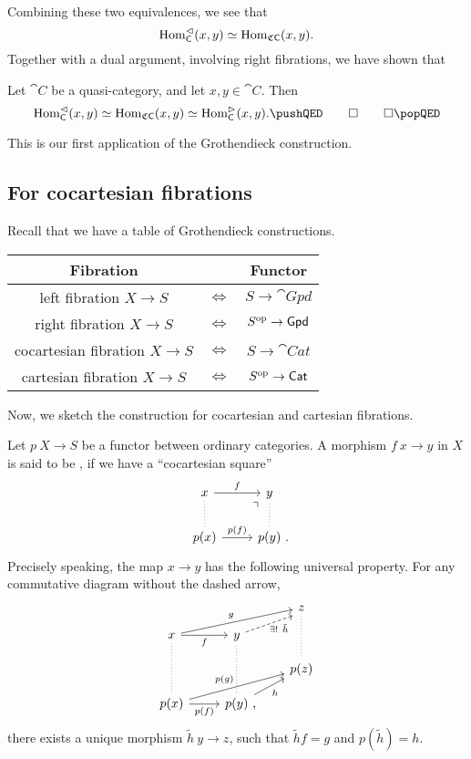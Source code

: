 Combining these two equivalences, we see that
\[\operatorname{Hom}_{\textup{\textsf{C}}}^\vartriangleleft(x,y)\simeq\operatorname{Hom}_{\mathfrak C\textup{\textsf{C}}}(x,y).\]
Together with a dual argument, involving right fibrations,
we have shown that 

\begin{theorem} \label{thm-5-h}
    Let $\cat C$ be a quasi-category, and let $x,y\in\cat C$. Then 
    \[\Hom_{\cat C}^\vartriangleleft(x,y)\simeq\Hom_{\mathfrak C\cat C}(x,y)
    \simeq\Hom_{\cat C}^\vartriangleright(x,y). \thmqedhere \]
\end{theorem}

This is our first application of the Grothendieck construction.

\subsection{For cocartesian fibrations}

Recall that we have a table of Grothendieck constructions.

\begin{center}
    \begin{tabular}{ccc}
        \textbf{Fibration} & & \textbf{Functor} \\ \hline
        left fibration $X\to S$ & $\Longleftrightarrow$ & $S\to\cat{Gpd}$ \\
        right fibration $X\to S$ & $\Longleftrightarrow$ & $S^{\mathrm{op}}\to\textup{\textsf{Gpd}}$ \\
        cocartesian fibration $X\to S$ & $\Longleftrightarrow$ & $S\to\cat{Cat}$ \\
        cartesian fibration $X\to S$ & $\Longleftrightarrow$ & $S^{\mathrm{op}}\to\textup{\textsf{Cat}}$ \\
    \end{tabular}
\end{center}

Now, we sketch the construction for cocartesian and cartesian fibrations.

Let $p\:X\to S$ be a functor between ordinary categories.
A morphism $f\:x\to y$ in $X$ is said to be ,
if we have a ``cocartesian square''
\[\begin{tikzcd}
    x\ar[d,dotted,dash]\ar[r,"f"] & y\ar[d,dotted,dash] \\
    p(x)\ar[r,"p(f)"]\ar[ur,phantom,end anchor=south west,very near end,"\urcorner"] & p(y)\rlap{\ .}
\end{tikzcd}\]
Precisely speaking, the map $x\to y$ has the following universal property.
For any commutative diagram without the dashed arrow,
\[\begin{tikzcd}[row sep=1em]
    && z\ar[dd,dotted,dash] \\
    x\ar[dd,dotted,dash]\ar[r,"f"']\ar[urr,"g"]
    & y\ar[dd,dotted,dash]\ar[ur,dashed,end anchor=south west,"\exists!\ \tilde h"' inner sep=0pt] \\
    && p(z) \\
    p(x)\ar[r,"p(f)"']\ar[urr,"p(g)"]
    & p(y)\rlap{\ ,} \ar[ur,"h"']
\end{tikzcd}\]
there exists a unique morphism $\tilde h\:y\to z$,
such that $\tilde hf=g$ and $p(\tilde h)=h$.


